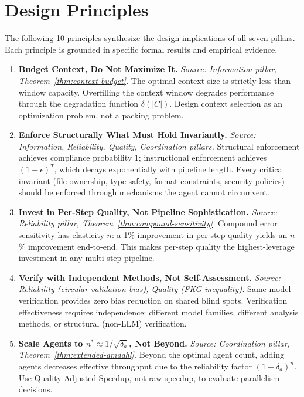 \section{Design Principles}
\label{sec:principles}

The following 10 principles synthesize the design implications of all seven pillars. Each principle is grounded in specific formal results and empirical evidence.

\begin{enumerate}[label=\textbf{P\arabic*.}, leftmargin=3em]

\item \textbf{Budget Context, Do Not Maximize It.}
\emph{Source: Information pillar, Theorem~\ref{thm:context-budget}.}
The optimal context size is strictly less than window capacity. Overfilling the context window degrades performance through the degradation function $\delta(|C|)$. Design context selection as an optimization problem, not a packing problem.

\item \textbf{Enforce Structurally What Must Hold Invariantly.}
\emph{Source: Information, Reliability, Quality, Coordination pillars.}
Structural enforcement achieves compliance probability 1; instructional enforcement achieves $(1-\epsilon)^T$, which decays exponentially with pipeline length. Every critical invariant (file ownership, type safety, format constraints, security policies) should be enforced through mechanisms the agent cannot circumvent.

\item \textbf{Invest in Per-Step Quality, Not Pipeline Sophistication.}
\emph{Source: Reliability pillar, Theorem~\ref{thm:compound-sensitivity}.}
Compound error sensitivity has elasticity $n$: a 1\% improvement in per-step quality yields an $n$\% improvement end-to-end. This makes per-step quality the highest-leverage investment in any multi-step pipeline.

\item \textbf{Verify with Independent Methods, Not Self-Assessment.}
\emph{Source: Reliability (circular validation bias), Quality (FKG inequality).}
Same-model verification provides zero bias reduction on shared blind spots. Verification effectiveness requires independence: different model families, different analysis methods, or structural (non-LLM) verification.

\item \textbf{Scale Agents to $n^* \approx 1/\sqrt{\delta_a}$, Not Beyond.}
\emph{Source: Coordination pillar, Theorem~\ref{thm:extended-amdahl}.}
Beyond the optimal agent count, adding agents decreases effective throughput due to the reliability factor $(1-\delta_a)^n$. Use Quality-Adjusted Speedup, not raw speedup, to evaluate parallelism decisions.


\end{enumerate}

